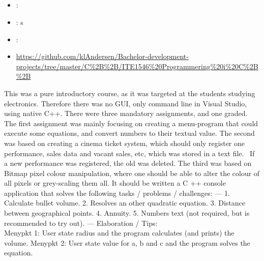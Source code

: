 \label{sec:section3}

\subsection[C++ course]{}
\label{sec:cpp_programming}
\begin{itemize} 
	\item {}: 
	\item {}: s
	\item {}: 
	\item {} \url{https://github.com/klAndersen/Bachelor-development-projects/tree/master/C%2B%2B/ITE1546%20Programmering%20i%20C%2B%2B}
\end{itemize} 
This was a pure introductory course, as it was targeted at the students studying electronics. 
Therefore there was no GUI, only command line in Visual Studio, using native C++.
There were three mandatory assignments, and one graded. 
\vspace{0.5em}\newline
The first assignment was mainly focusing on creating a menu-program that could execute some equations, and convert numbers to their textual value. 
The second was based on creating a cinema ticket system, which should only register one performance, sales data and vacant sales, etc, which was stored in a text file. 
If a new performance was registered, the old was deleted. 
The third was based on Bitmap pixel colour manipulation, where one should be able to alter the colour of all pixels or grey-scaling them all.
\vspace{0.5em}\newline
It should be written a C ++ console application that solves the following tasks / problems / challenges:
---
1. Calculate bullet volume.
2. Resolves an other quadratic equation.
3. Distance between geographical points.
4. Annuity.
5. Numbers text (not required, but is recommended to try out).
---
Elaboration / Tips: \\
Menypkt 1: User state radius and the program calculates (and prints) the volume.
Menypkt 2: User state value for a, b and c and the program solves the equation.
